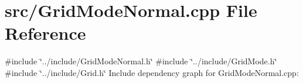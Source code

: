 \section{src/\-Grid\-Mode\-Normal.cpp \-File \-Reference}
\label{_grid_mode_normal_8cpp}
{\ttfamily \#include \char`\"{}../include/\-Grid\-Mode\-Normal.\-h\char`\"{}}\*
{\ttfamily \#include \char`\"{}../include/\-Grid\-Mode.\-h\char`\"{}}\*
{\ttfamily \#include \char`\"{}../include/\-Grid.\-h\char`\"{}}\*
\-Include dependency graph for \-Grid\-Mode\-Normal.\-cpp\-:
